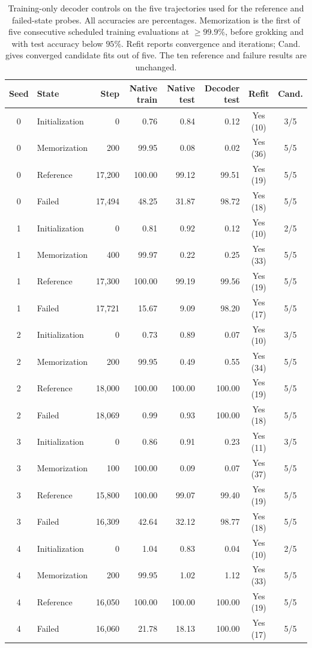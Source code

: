 \begin{table}[t]
\centering\small
\setlength{\tabcolsep}{3.2pt}
\caption{Training-only decoder controls on the five trajectories used for the reference and failed-state probes. All accuracies are percentages. Memorization is the first of five consecutive scheduled training evaluations at $\geq99.9\%$, before grokking and with test accuracy below $95\%$. Refit reports convergence and iterations; Cand. gives converged candidate fits out of five. The ten reference and failure results are unchanged.}
\label{tab:decoder-phase-controls}
\begin{tabular}{clrrrrcc}
\toprule
Seed & State & Step & Native train & Native test & Decoder test & Refit & Cand. \\
\midrule
0 & Initialization & 0 & 0.76 & 0.84 & 0.12 & Yes (10) & 3/5 \\
0 & Memorization & 200 & 99.95 & 0.08 & 0.02 & Yes (36) & 5/5 \\
0 & Reference & 17{,}200 & 100.00 & 99.12 & 99.51 & Yes (19) & 5/5 \\
0 & Failed & 17{,}494 & 48.25 & 31.87 & 98.72 & Yes (18) & 5/5 \\
\midrule
1 & Initialization & 0 & 0.81 & 0.92 & 0.12 & Yes (10) & 2/5 \\
1 & Memorization & 400 & 99.97 & 0.22 & 0.25 & Yes (33) & 5/5 \\
1 & Reference & 17{,}300 & 100.00 & 99.19 & 99.56 & Yes (19) & 5/5 \\
1 & Failed & 17{,}721 & 15.67 & 9.09 & 98.20 & Yes (17) & 5/5 \\
\midrule
2 & Initialization & 0 & 0.73 & 0.89 & 0.07 & Yes (10) & 3/5 \\
2 & Memorization & 200 & 99.95 & 0.49 & 0.55 & Yes (34) & 5/5 \\
2 & Reference & 18{,}000 & 100.00 & 100.00 & 100.00 & Yes (19) & 5/5 \\
2 & Failed & 18{,}069 & 0.99 & 0.93 & 100.00 & Yes (18) & 5/5 \\
\midrule
3 & Initialization & 0 & 0.86 & 0.91 & 0.23 & Yes (11) & 3/5 \\
3 & Memorization & 100 & 100.00 & 0.09 & 0.07 & Yes (37) & 5/5 \\
3 & Reference & 15{,}800 & 100.00 & 99.07 & 99.40 & Yes (19) & 5/5 \\
3 & Failed & 16{,}309 & 42.64 & 32.12 & 98.77 & Yes (18) & 5/5 \\
\midrule
4 & Initialization & 0 & 1.04 & 0.83 & 0.04 & Yes (10) & 2/5 \\
4 & Memorization & 200 & 99.95 & 1.02 & 1.12 & Yes (33) & 5/5 \\
4 & Reference & 16{,}050 & 100.00 & 100.00 & 100.00 & Yes (19) & 5/5 \\
4 & Failed & 16{,}060 & 21.78 & 18.13 & 100.00 & Yes (17) & 5/5 \\
\bottomrule
\end{tabular}
\end{table}
